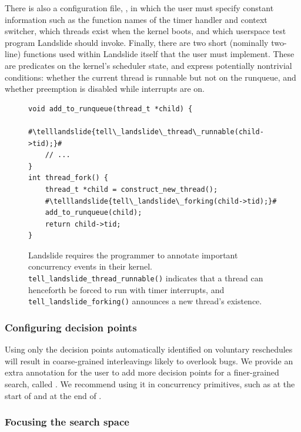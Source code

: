 There is also a configuration file, , in which the user must specify constant information such as the function names of the timer handler and context switcher, which threads exist when the kernel boots, and which userspace test program Landslide should invoke.
Finally, there are two short (nominally two-line) functions used within Landslide itself that the user must implement. These are predicates on the kernel's scheduler state, and express potentially nontrivial conditions: whether the current thread is runnable but not on the runqueue, and whether preemption is disabled while interrupts are on.

\newcommand\telllandslide[1]{\bfseries \color{violet}{#1}}
\begin{figure}[t]
\small
\begin{lstlisting}
void add_to_runqueue(thread_t *child) {
	#\telllandslide{tell\_landslide\_thread\_runnable(child->tid);}#
	// ...
}
int thread_fork() {
	thread_t *child = construct_new_thread();
	#\telllandslide{tell\_landslide\_forking(child->tid);}#
	add_to_runqueue(child);
	return child->tid;
}
\end{lstlisting}
\caption{Landslide requires the programmer to annotate important concurrency events in their kernel. \texttt{tell\_landslide\_thread\_runnable()} indicates that a thread can henceforth be forced to run with timer interrupts, and \texttt{tell\_landslide\_forking()} announces a new thread's existence.}
\label{fig:annotation}
\end{figure}

\subsubsection{Configuring decision points}
\label{sec:decision}

Using only the decision points automatically identified on voluntary reschedules will result in coarse-grained interleavings likely to overlook bugs.
We provide an extra annotation
for the user to add more decision points for a finer-grained search, called
.
We recommend using it in concurrency primitives, such as at the start of  and at the end of .

\subsubsection{Focusing the search space}
\label{sec:focusing}

